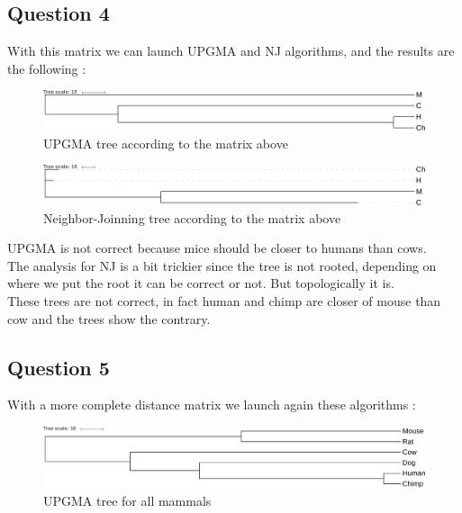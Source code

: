 \documentclass[]{article}
\theoremstyle{definition}
\begin{document}
\newpage 
\subsection{Question 4}


With this matrix we can launch UPGMA and NJ algorithms, and the results are the following :
 
\begin{figure}[h!]

	\includegraphics*[width = \linewidth]{../UPGMA1.pdf}
	\caption{\label{upgma1} UPGMA tree according to the matrix above }
\end{figure}


\begin{figure}[h!!]
	\includegraphics*[width = \linewidth]{../NJ1.pdf}
	\caption{\label{nj1} Neighbor-Joinning tree according to the matrix above }
\end{figure}


UPGMA is not correct because mice should be closer to humans than cows.\\
The analysis for NJ is a bit trickier since the tree is not rooted, depending on where we put the root it can be correct or not. But topologically it is.\\
These trees are not correct, in fact human and chimp are closer of mouse than cow and the trees show the contrary. 

\subsection{Question 5}

With a more complete distance matrix we launch again these algorithms :

\begin{figure}[h!]
	\includegraphics*[width = \linewidth]{../files/UPGMA.pdf}
	\caption{\label{upgma2} UPGMA tree for all mammals }
\end{figure}
\end{document}

